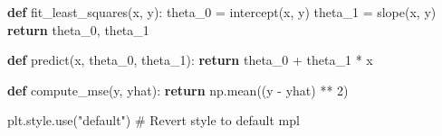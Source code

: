\documentclass[
  letterpaper,
  DIV=11,
  numbers=noendperiod]{scrreprt}
\newenvironment{Shaded}{\begin{snugshade}}{\end{snugshade}}
\newcommand{\CommentTok}[1]{\textcolor[rgb]{0.37,0.37,0.37}{#1}}
\newcommand{\ControlFlowTok}[1]{\textcolor[rgb]{0.00,0.23,0.31}{\textbf{#1}}}
\newcommand{\DecValTok}[1]{\textcolor[rgb]{0.68,0.00,0.00}{#1}}
\newcommand{\KeywordTok}[1]{\textcolor[rgb]{0.00,0.23,0.31}{\textbf{#1}}}
\newcommand{\NormalTok}[1]{\textcolor[rgb]{0.00,0.23,0.31}{#1}}
\newcommand{\OperatorTok}[1]{\textcolor[rgb]{0.37,0.37,0.37}{#1}}
\newcommand{\StringTok}[1]{\textcolor[rgb]{0.13,0.47,0.30}{#1}}
\begin{document}
\begin{Shaded}
\begin{Highlighting}[]
\KeywordTok{def}\NormalTok{ fit\_least\_squares(x, y):}
\NormalTok{    theta\_0 }\OperatorTok{=}\NormalTok{ intercept(x, y)}
\NormalTok{    theta\_1 }\OperatorTok{=}\NormalTok{ slope(x, y)}
    \ControlFlowTok{return}\NormalTok{ theta\_0, theta\_1}


\KeywordTok{def}\NormalTok{ predict(x, theta\_0, theta\_1):}
    \ControlFlowTok{return}\NormalTok{ theta\_0 }\OperatorTok{+}\NormalTok{ theta\_1 }\OperatorTok{*}\NormalTok{ x}


\KeywordTok{def}\NormalTok{ compute\_mse(y, yhat):}
    \ControlFlowTok{return}\NormalTok{ np.mean((y }\OperatorTok{{-}}\NormalTok{ yhat) }\OperatorTok{**} \DecValTok{2}\NormalTok{)}


\NormalTok{plt.style.use(}\StringTok{"default"}\NormalTok{)  }\CommentTok{\# Revert style to default mpl}
\end{Highlighting}
\end{Shaded}
\end{document}
